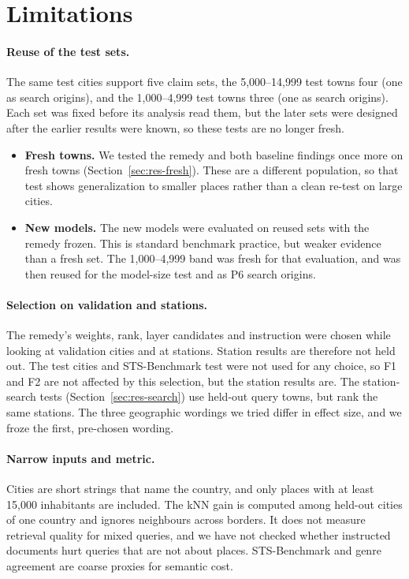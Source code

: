 \section{Limitations}
\label{sec:limitations}

\paragraph{Reuse of the test sets.}
The same test cities support five claim sets, the 5,000--14,999 test towns four (one as search origins), and the 1,000--4,999 test towns three (one as search origins). Each set was fixed before its analysis read them, but the later sets were designed after the earlier results were known, so these tests are no longer fresh.
\begin{itemize}
\item \textbf{Fresh towns.} We tested the remedy and both baseline findings once more on fresh towns (Section~\ref{sec:res-fresh}). These are a different population, so that test shows generalization to smaller places rather than a clean re-test on large cities.
\item \textbf{New models.} The new models were evaluated on reused sets with the remedy frozen. This is standard benchmark practice, but weaker evidence than a fresh set. The 1,000--4,999 band was fresh for that evaluation, and was then reused for the model-size test and as P6 search origins.
\end{itemize}

\paragraph{Selection on validation and stations.}
The remedy's weights, rank, layer candidates and instruction were chosen while looking at validation cities and at stations. Station results are therefore not held out. The test cities and STS-Benchmark test were not used for any choice, so F1 and F2 are not affected by this selection, but the station results are. The station-search tests (Section~\ref{sec:res-search}) use held-out query towns, but rank the same stations. The three geographic wordings we tried differ in effect size, and we froze the first, pre-chosen wording.

\paragraph{Narrow inputs and metric.}
Cities are short strings that name the country, and only places with at least 15,000 inhabitants are included. The kNN gain is computed among held-out cities of one country and ignores neighbours across borders. It does not measure retrieval quality for mixed queries, and we have not checked whether instructed documents hurt queries that are not about places. STS-Benchmark and genre agreement are coarse proxies for semantic cost.

